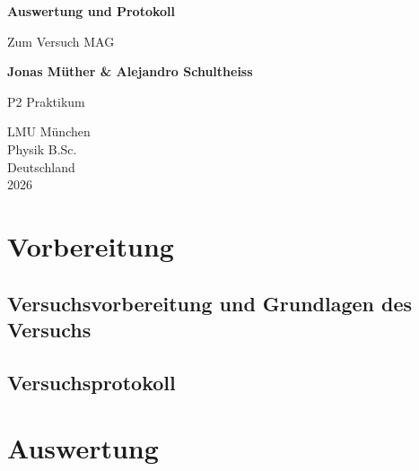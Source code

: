 \documentclass{report}
\begin{document}

\begin{titlepage}
    \begin{center}
        \vspace*{1cm}
            
        \Huge
        \textbf{Auswertung und Protokoll}
            
        \vspace{0.5cm}
        \LARGE
        Zum Versuch MAG
        
        \vspace{1.8cm}

        \textbf{Jonas Müther \& Alejandro Schultheiss}
        \vfill
            
        P2 Praktikum\\
       
            
        \vspace{0.8cm}
  

        \vspace{1.8cm}
        \Large
        LMU München \\
        Physik B.Sc.\\
        Deutschland\\
        2026
            
    \end{center}
\end{titlepage}
\tableofcontents

\newpage
\chapter{Vorbereitung}

\section{Versuchsvorbereitung und Grundlagen des Versuchs}


\section{Versuchsprotokoll}


\newpage
\chapter{Auswertung}
\newpage
\end{document}
